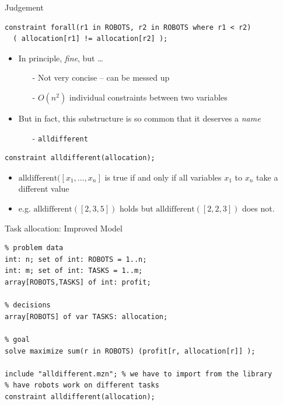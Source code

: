 \begin{frame}[fragile]{Judgement}
\begin{lstlisting}
constraint forall(r1 in ROBOTS, r2 in ROBOTS where r1 < r2) 
  ( allocation[r1] != allocation[r2] );
\end{lstlisting}
\begin{itemize}
\item In principle, \emph{fine}, but \ldots
\begin{itemize}
\item[-] Not very concise -- can be messed up
\item[-] $O(n^2)$ individual constraints between two variables
\end{itemize}
\pause 

\vspace*{1ex}

\item But in fact, this substructure is so common that it deserves a \emph{name}
\begin{itemize}
\item[-] \texttt{alldifferent}
\end{itemize}
\end{itemize}
\begin{lstlisting}
constraint alldifferent(allocation);
\end{lstlisting}
\begin{itemize}
\item $\mathrm{alldifferent}([x_1, \ldots, x_n]$ is true if and only if all variables $x_1$ to $x_n$ take a different value
\item e.g. $\mathrm{alldifferent}([2,3,5])$ holds but $\mathrm{alldifferent}([2,2,3])$ does not.
\end{itemize}
\end{frame}

\begin{frame}[fragile]{Task allocation: Improved Model}
\begin{lstlisting}
% problem data 
int: n; set of int: ROBOTS = 1..n;
int: m; set of int: TASKS = 1..m;
array[ROBOTS,TASKS] of int: profit;

% decisions
array[ROBOTS] of var TASKS: allocation;

% goal
solve maximize sum(r in ROBOTS) (profit[r, allocation[r]] );

include "alldifferent.mzn"; % we have to import from the library
% have robots work on different tasks
constraint alldifferent(allocation);
\end{lstlisting}
\end{frame}

